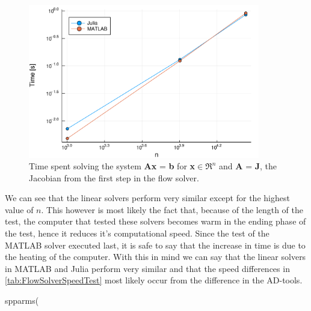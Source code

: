 \begin{figure}[htbp]
    \centering
    \includegraphics[width = 0.9\textwidth]{figures/benchmark_linear_solvers.pdf}
    \caption{Time spent solving the system \textbf{Ax} = \textbf{b} for \textbf{x}$\in\Re^{n}$ and \textbf{A} = \textbf{J}, the Jacobian from the first step in the flow solver.}
    \label{fig:benchmarkLinearSolver}
\end{figure}
We can see that the linear solvers perform very similar except for the highest value of $n$. This however is most likely the fact that, because of the length of the test, the computer that tested these solvers becomes warm in the ending phase of the test, hence it reduces it's computational speed. Since the test of the MATLAB solver executed last, it is safe to say that the increase in time is due to the heating of the computer. With this in mind we can say that the linear solvers in MATLAB and Julia perform very similar and that the speed differences in \autoref{tab:FlowSolverSpeedTest} most likely occur from the difference in the AD-tools.


spparms(